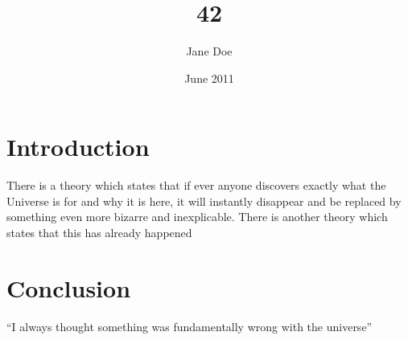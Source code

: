 \documentclass{article}
\title{42}
\author{Jane Doe}
\date{June 2011}
\begin{document}
\maketitle

\section{Introduction}
There is a theory which states that if ever anyone discovers exactly what
 the Universe is for and why it is here, 
it will instantly disappear and be replaced by something even more bizarre 
and inexplicable.
There is another theory which states that this has already happened


\section{Conclusion}
``I always thought something was fundamentally wrong with the universe'' \citep{adams1995hitchhiker}



\end{document}
